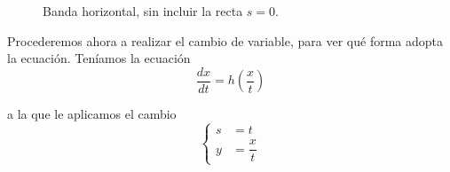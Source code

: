 \begin{figure}[H]
\centering
{}
\caption{Banda horizontal, sin incluir la recta $s = 0$.}
\label{fig:banda_horizontal}
\end{figure}
Procederemos ahora a realizar el cambio de variable, para ver qué forma adopta la ecuación. Teníamos la ecuación
\begin{equation*}
    \dfrac{dx}{dt} = h\left(\dfrac{x}{t}\right)
\end{equation*}

a la que le aplicamos el cambio
\begin{equation*}
    \left\{\begin{array}{rl}
            s &= t \\
            y &= \dfrac{x}{t}
    \end{array}\right.
\end{equation*}

